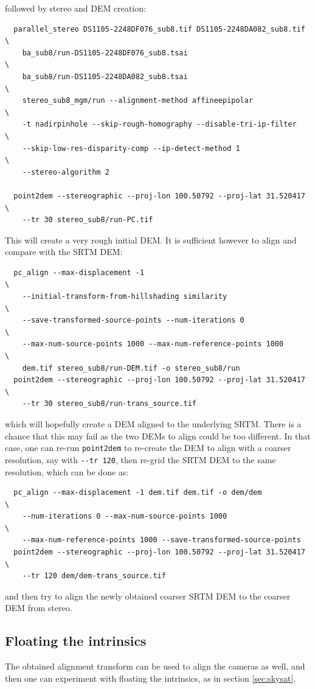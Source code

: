 followed by stereo and DEM creation:
\begin{verbatim}
  parallel_stereo DS1105-2248DF076_sub8.tif DS1105-2248DA082_sub8.tif \
    ba_sub8/run-DS1105-2248DF076_sub8.tsai                            \
    ba_sub8/run-DS1105-2248DA082_sub8.tsai                            \
    stereo_sub8_mgm/run --alignment-method affineepipolar             \
    -t nadirpinhole --skip-rough-homography --disable-tri-ip-filter   \
    --skip-low-res-disparity-comp --ip-detect-method 1                \
    --stereo-algorithm 2 

  point2dem --stereographic --proj-lon 100.50792 --proj-lat 31.520417 \
    --tr 30 stereo_sub8/run-PC.tif
\end{verbatim}

This will create a very rough initial DEM. It is sufficient however
to align and compare with the SRTM DEM:

\begin{verbatim}
  pc_align --max-displacement -1                                      \
    --initial-transform-from-hillshading similarity                   \
    --save-transformed-source-points --num-iterations 0               \
    --max-num-source-points 1000 --max-num-reference-points 1000      \
    dem.tif stereo_sub8/run-DEM.tif -o stereo_sub8/run
  point2dem --stereographic --proj-lon 100.50792 --proj-lat 31.520417 \
    --tr 30 stereo_sub8/run-trans_source.tif
\end{verbatim}

which will hopefully create a DEM aligned to the underlying SRTM. There
is a chance that this may fail as the two DEMs to align could be too
different. In that case, one can re-run \texttt{point2dem} to re-create
the DEM to align with a coarser resolution, say with \texttt{-\/-tr
120}, then re-grid the SRTM DEM to the same resolution, which can be
done as:

\begin{verbatim}
  pc_align --max-displacement -1 dem.tif dem.tif -o dem/dem             \
    --num-iterations 0 --max-num-source-points 1000                     \
    --max-num-reference-points 1000 --save-transformed-source-points
  point2dem --stereographic --proj-lon 100.50792 --proj-lat 31.520417   \
    --tr 120 dem/dem-trans_source.tif
\end{verbatim}

and then try to align the newly obtained coarser SRTM DEM to the 
coarser DEM from stereo. 

\subsection{Floating the intrinsics}

The obtained alignment transform can be used to align 
the cameras as well, and then one can experiment with 
floating the intrinsics, as in section \ref{sec:skysat}.

